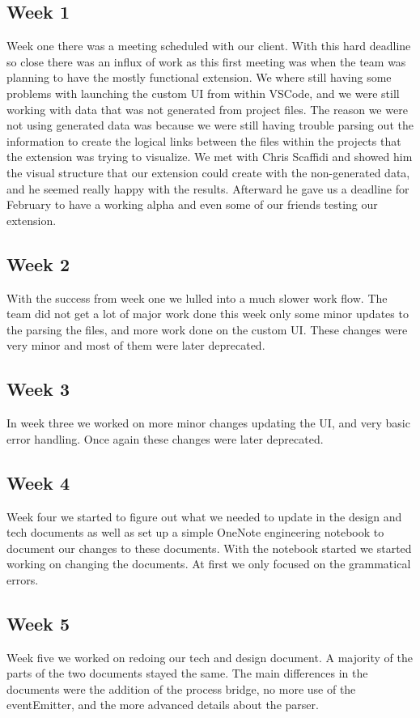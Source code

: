\documentclass[letterpaper,10pt,titlepage,draftclsnofoot,onecolumn,onesided] {IEEEtran}
\begin{document}
	\subsection{Week 1}
	Week one there was a meeting scheduled with our client. 
	With this hard deadline so close there was an influx of work as this first meeting was when the team was planning to have the mostly functional extension. 
	We where still having some problems with launching the custom UI from within VSCode, and we were still working with data that was not generated from project files.
	The reason we were not using generated data was because we were still having trouble parsing out the information to create the logical links between the files within the projects that the extension was trying to visualize. 
	We met with Chris Scaffidi and showed him the visual structure that our extension could create with the non-generated data, and he seemed really happy with the results.
	Afterward he gave us a deadline for February to have a working alpha and even some of our friends testing our extension. 
	
	\subsection{Week 2}
	With the success from week one we lulled into a much slower work flow. 
	The team did not get a lot of major work done this week only some minor updates to the parsing the files, and more work done on the custom UI. 
	These changes were very minor and most of them were later deprecated.

	\subsection{Week 3}
	In week three we worked on more minor changes updating the UI, and very basic error handling.
	Once again these changes were later deprecated. 

	\subsection{Week 4}
	Week four we started to figure out what we needed to update in the design and tech documents as well as set up a simple OneNote engineering notebook to document our changes to these documents.
	With the notebook started we started working on changing the documents. 
	At first we only focused on the grammatical errors.

	\subsection{Week 5}
	Week five we worked on redoing our tech and design document.
	A majority of the parts of the two documents stayed the same. 
	The main differences in the documents were the addition of the process bridge, no more use of the eventEmitter, and the more advanced details about the parser. 
	
\end{document}
